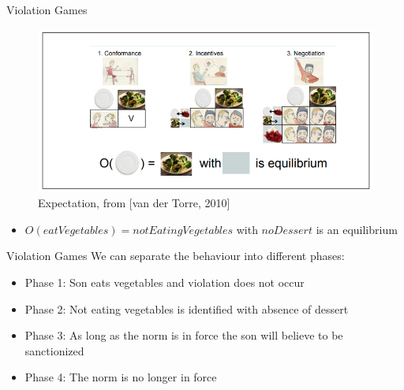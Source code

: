 \documentclass[10pt]{beamer}
\begin{document}
\begin{frame}[fragile]{Violation Games}
\begin{figure}[!htb]
    \centering
    \includegraphics[scale=0.8]{3.png}
    \caption{Expectation, from [van der Torre, 2010]}
    \label{fig:my_label}
\end{figure}
\begin{itemize}
    \item $O(eatVegetables) = notEatingVegetables$ with $noDessert$ is an equilibrium
\end{itemize}
\end{frame}

\begin{frame}[fragile]{Violation Games}
We can separate the behaviour into different phases:\\
\begin{itemize}
    \item Phase 1: Son eats vegetables and violation does not occur
    \item Phase 2: Not eating vegetables is identified with absence of dessert
    \item Phase 3: As long as the norm is in force the son will believe to be sanctionized
    \item Phase 4: The norm is no longer in force
\end{itemize}
\end{frame}
\end{document}
